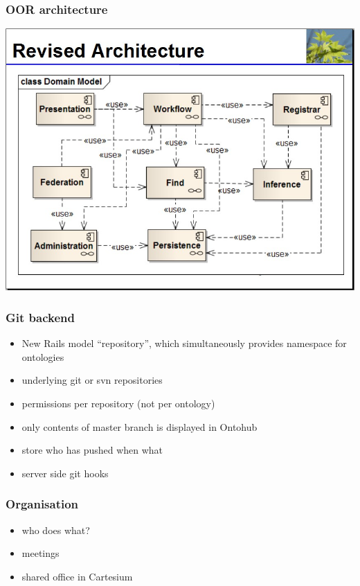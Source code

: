\documentclass[german]{beamer}
\begin{document}
\begin{frame}
\frametitle{OOR architecture}
\includegraphics[width=\textwidth]{revised-OOR-architecture-proposal--ToddSchneider-KenBaclawski_20101119.jpg}
\end{frame}


\begin{frame}
\frametitle{Git backend}
\begin{itemize}
\item New Rails model ``repository'', which simultaneously provides namespace for ontologies
\item underlying git or svn repositories
\item permissions per repository (not per ontology)
\item only contents of master branch is displayed in Ontohub
\item store who has pushed when what
\item server side git hooks
\end{itemize}
\end{frame}

\begin{frame}
\frametitle{Organisation}
\begin{itemize}
\item who does what?
\item meetings
\item shared office in Cartesium
\end{itemize}
\end{frame}
\end{document}
